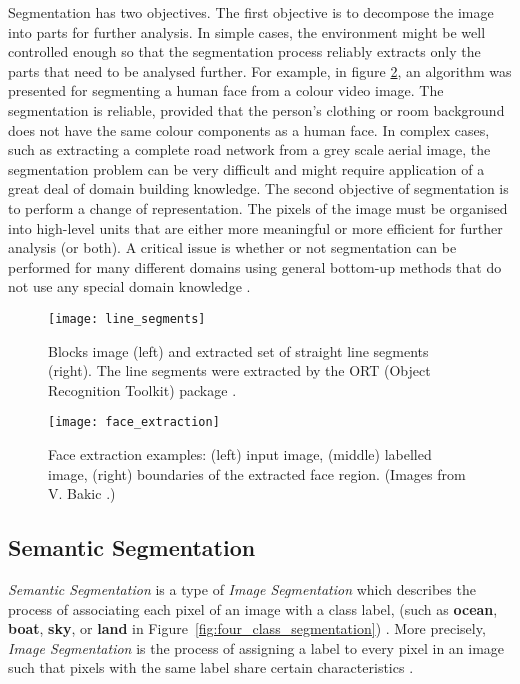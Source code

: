 Segmentation has two objectives. The first objective is to decompose the image
into parts for further analysis. In simple cases, the environment might be well
controlled enough so that the segmentation process reliably extracts only the
parts that need to be analysed further. For example, in figure
\ref{fig:face_extraction}, an algorithm was presented for segmenting a human
face from a colour video image. The segmentation is reliable, provided that the
person's clothing or room background does not have the same colour components
as a human face. In complex cases, such as extracting a complete road network
from a grey scale aerial image, the segmentation problem can be very difficult
and might require application of a great deal of domain building knowledge.
The second objective of segmentation is to perform a change of representation.
The pixels of the image must be organised into high-level units that are either
more meaningful or more efficient for further analysis (or both). A critical
issue is whether or not segmentation can be performed for many different
domains using general bottom-up methods that do not use any special domain
knowledge \cite{book:28867}.
\begin{figure}[h]
    \centering
    \texttt{[image: line\_segments]}
    \caption{Blocks image (left) and extracted set of straight line segments
    (right). The line segments were extracted by the ORT (Object Recognition
    Toolkit) package \cite{book:28867}.}
    \label{fig:line_segments}
\end{figure}
\begin{figure}[h]
    \centering
    \texttt{[image: face\_extraction]}
    \caption{
        Face extraction examples: (left) input image, (middle) labelled image,
        (right) boundaries of the extracted face region. (Images from V.
        Bakic \cite{book:28867}.)
    }
    \label{fig:face_extraction}
\end{figure}


\subsection{Semantic Segmentation}
\emph{Semantic Segmentation} is a type of \emph{Image Segmentation} which
describes the process of associating each pixel of an image with a class label,
(such as \textbf{ocean}, \textbf{boat}, \textbf{sky}, or \textbf{land} in
Figure~\ref{fig:four_class_segmentation}) \cite{matlab_segmentation}. More
precisely, \emph{Image Segmentation} is the process of assigning a label to
every pixel in an image such that pixels with the same label share certain
characteristics \cite{tum_segmentation}.


